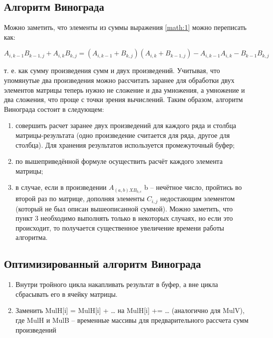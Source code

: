 \documentclass[a4paper, 14pt]{article}
\begin{document}
	\subsection{Алгоритм Винограда}
	
	Можно заметить, что элементы из суммы выражения \ref{math:1} можно переписать как:
	
	\begin{equation}
		A_{i, k-1}B_{k-1,j} + A_{i,k}B_{k,j} = (A_{i,k-1} + B_{k,j})(A_{i,k} + B_{k-1,j}) - A_{i,k-1}A_{i,k} - B_{k-1}B_{k,j}
	\end{equation}
	
	т. е. как сумму произведения сумм и двух произведений. Учитывая, что упомянутые два произведения можно рассчитать заранее для обработки двух элементов матрицы теперь нужно не сложение и два умножения, а умножение и два сложения, что проще с точки зрения вычислений. Таким образом, алгоритм Винограда состоит в следующем:
	
	\begin{enumerate}
		\item совершить расчет заранее двух произведений для каждого ряда и столбца матрицы-результата (одно произведение считается для ряда, другое для столбца). Для хранения результатов используется промежуточный буфер;
		
		\item по вышеприведённой формуле осуществить расчёт каждого элемента матрицы;
		
		\item в случае, если в произведении $A_{(a,b) X B_{b,c}}$ b – нечётное число, пройтись во второй раз по матрице, дополняя элементы $C_{i,j}$ недостающим элементом (который не был описан вышеописанной суммой). Можно заметить, что пункт 3 необходимо выполнять только в некоторых случаях, но если это происходит, то получается существенное увеличение времени работы алгоритма.
	\end{enumerate} 
	
	\subsection{Оптимизированный алгоритм Винограда}
	
	\begin{enumerate}
		\item Внутри тройного цикла накапливать результат в буфер, а вне цикла сбрасывать его в ячейку матрицы.
		\item Заменить MulH[i] = MulH[i] + … на MulH[i] += … (аналогично для MulV),
		где MulH и MulB – временные массивы для предварительного рассчета сумм произведений
		
	\end{enumerate}
\end{document}
